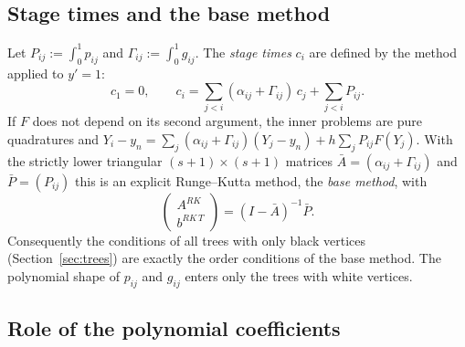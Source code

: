 \documentclass[11pt,a4paper]{article}
\theoremstyle{definition}
\theoremstyle{remark}
\begin{document}
\subsection{Stage times and the base method}

Let $P_{ij}:=\int_0^1p_{ij}$ and $\Gamma_{ij}:=\int_0^1g_{ij}$. The
\emph{stage times} $c_i$ are defined by the method applied to $y'=1$:
\begin{equation}\label{eq:ci}
 c_1=0,\qquad c_i=\sum_{j<i}(\alpha_{ij}+\Gamma_{ij})\,c_j+\sum_{j<i}P_{ij}.
\end{equation}
If $F$ does not depend on its second argument, the inner problems are
pure quadratures and
$Y_i-y_n=\sum_j(\alpha_{ij}+\Gamma_{ij})(Y_j-y_n)+h\sum_jP_{ij}F(Y_j)$.
With the strictly lower triangular $(s+1)\times(s+1)$ matrices
$\bar A=(\alpha_{ij}+\Gamma_{ij})$ and $\bar P=(P_{ij})$ this is an
explicit Runge--Kutta method, the \emph{base method}, with
\begin{equation}\label{eq:basemethod}
 \begin{pmatrix}A^{RK}\\ b^{RK\,T}\end{pmatrix}=(I-\bar A)^{-1}\bar P .
\end{equation}
Consequently the conditions of all trees with only black vertices
(Section~\ref{sec:trees}) are exactly the order conditions of the base
method. The polynomial shape of $p_{ij}$ and $g_{ij}$ enters only the
trees with white vertices.

\subsection{Role of the polynomial coefficients}
\label{sec:polygamma}
\end{document}
